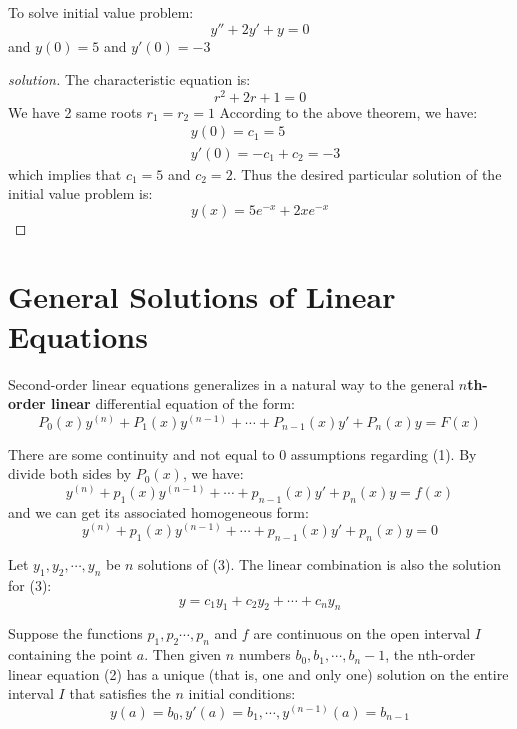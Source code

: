 \begin{example}
    To solve initial value problem:
    \[
        y'' + 2y' + y = 0
    \]
    and \(y(0) = 5\) and \(y'(0) = -3\)  
\end{example}
\begin{proof}[solution]
    The characteristic equation is: 
    \[
        r^2 + 2r + 1 = 0
    \]
    We have 2 same roots \(r_1 = r_2 = 1\) 
    According to the above theorem, we have:
    \begin{align*}
        &y(0) = c_1 = 5 \\
        &y'(0) = -c_1 + c_2 = -3
    \end{align*}
    which implies that \(c_1 = 5\) and \(c_2 = 2\).   
    Thus the desired particular solution of the initial value problem is:
    \[
        y(x) = 5e^{-x} + 2xe^{-x}
    \]
\end{proof}

\section{General Solutions of Linear Equations}

Second-order linear equations generalizes in a natural way to the general \(n\)\textbf{th-order linear} differential equation of the form:
\[
    P_0(x)y^{(n)} + 
    P_1(x)y^{(n-1)} + 
    \cdots +
    P_{n-1}(x) y' + 
    P_n(x) y = F(x) \tag{1}
\]  

There are some continuity and not equal to 0 assumptions regarding (1).
By divide both sides by \(P_0(x)\), we have:
\[
    y^{(n)} + 
    p_1(x)y^{(n-1)} + 
    \cdots +
    p_{n-1}(x) y' + 
    p_n(x) y = f(x) \tag{2}
\]
and we can get its associated homogeneous form:
\[
    y^{(n)} + 
    p_1(x)y^{(n-1)} + 
    \cdots +
    p_{n-1}(x) y' + 
    p_n(x) y = 0 \tag{3}
\]

\begin{theorem}
   Let \(y_1, y_2, \cdots, y_n\)  be \(n\)  solutions of (3).  
   The linear combination is also the solution for (3):
\[
    y = c_1y_1 + c_2y_2 + \cdots + c_ny_n
\]
\end{theorem}

\begin{theorem}
    Suppose the functions \(p_1, p_2 \cdots, p_n\) and \(f\) are continuous on the open interval \(I\)  containing the point \(a\).   
    Then given \(n\) numbers \(b_0, b_1, \cdots, b_n-1\), the nth-order linear equation (2) has a unique (that is, one and only one) solution on the entire interval \(I\) that satisfies the \(n\) initial conditions:
    \[
        y(a) = b_0, y'(a) = b_1, \cdots, y^{(n-1)}(a) = b_{n-1}
    \]  
\end{theorem}
